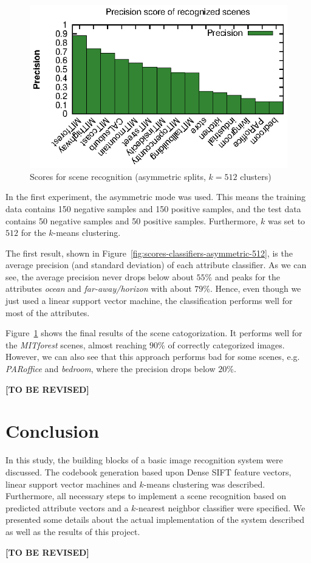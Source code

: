 \documentclass{vldb}
\newcommand{\tbr}{{\color{red}\textbf{[TO BE REVISED]}}}
\begin{document}
\begin{figure}[ht]
  \centering
  \includegraphics[width = .45\textwidth]{figs/scores_sr_asymmetric_512classes.eps}
  \caption{Scores for scene recognition \newline (asymmetric splits, $k=512$ clusters)}
  \label{fig:scores-scene-rec-asymmetric-512}
\end{figure}

In the first experiment, the asymmetric mode was used. This means the training
data contains 150 negative samples and 150 positive samples, and the test data
contains 50 negative samples and 50 positive samples. Furthermore, $k$ was set
to $512$ for the $k$-means clustering.

The first result, shown in Figure~\ref{fig:scores-classifiers-asymmetric-512},
is the average precision (and standard deviation) of each attribute classifier.
As we can see, the average precision never drops below about $55$\% and peaks
for the attributes \emph{ocean} and \emph{far-away/horizon} with about $79$\%.
Hence, even though we just used a linear support vector machine, the
classification performs well for most of the attributes.

Figure~\ref{fig:scores-scene-rec-asymmetric-512} shows the final results of the
scene catogorization. It performs well for the \emph{MITforest} scenes,
almost reaching $90$\% of correctly categorized images. However, we can also see
that this approach performs bad for some scenes, e.g. \emph{PARoffice} and
\emph{bedroom}, where the precision drops below $20$\%.

\tbr

\section{Conclusion}
\label{sec:conclusion}

In this study, the building blocks of a basic image recognition system were
discussed. The codebook generation based upon Dense SIFT feature vectors, linear
support vector machines and $k$-means clustering was described. Furthermore, all
necessary steps to implement a scene recognition based on predicted attribute
vectors and a $k$-nearest neighbor classifier were specified. We presented some
details about the actual implementation of the system described as well as the
results of this project.

\tbr

\balance



\end{document}
